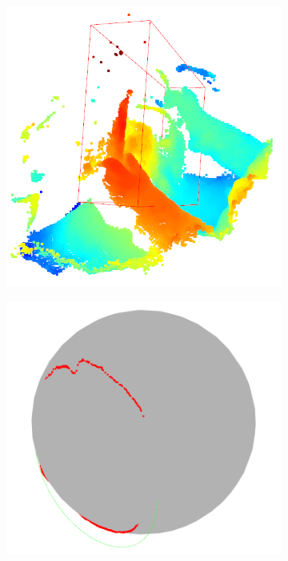 \begin{figure}[ht]
\begin{subfigure}[t]{0.18\textwidth}
        \caption{}
        \label{fig:sampled_points}
    \end{subfigure}\hfill
    \begin{subfigure}[t]{0.18\textwidth}
        \centering
        \includegraphics[width=\textwidth]{media/chapter 4/obb.png}
        \caption{}
        \label{fig:obb}
    \end{subfigure}\hfill
    \begin{subfigure}[t]{0.18\textwidth}
        \centering
        \includegraphics[width=\textwidth]{media/chapter 4/sphere.png}

\end{subfigure}
\end{figure}
